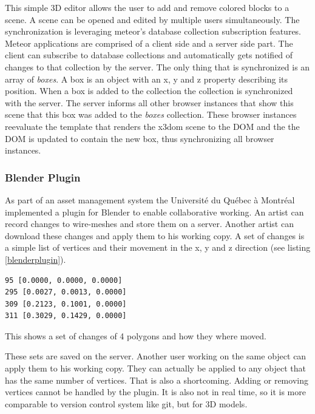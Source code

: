 This simple \gls{3D} editor allows the user to add and remove colored blocks to a
scene. A scene can be opened and edited by multiple users simultaneously. The synchronization is leveraging meteor's database collection
subscription features. Meteor applications are comprised of a client side and a
server side part. The client can subscribe to database collections and
automatically gets notified of changes to that collection by the server. The only
thing that is synchronized is an array of \emph{boxes}. A box is an
object with an x, y and z property describing its position. When a box is
added to the collection the collection is synchronized with the server. The
server informs all other browser instances that show this scene that this box was added to the \emph{boxes} collection.
These browser instances reevaluate the template that renders the x3dom scene to
the \gls{DOM} and the the \gls{DOM} is updated to contain the new box, thus synchronizing
all browser instances. \cite{3dmeteor}

\subsubsection{Blender Plugin}
\label{blender-plugin}

As part of an asset management system the Université du Québec à
Montréal implemented a plugin for Blender to enable collaborative working. An
artist can record changes to wire-meshes and store them on a server.
Another artist can download these changes and apply them to his working
copy. A set of changes is a simple list of vertices and their movement in the
x, y and z direction (see listing \ref{blenderplugin}). \cite{LCR07}

\begin{listing}
  \begin{verbatim}
95 [0.0000, 0.0000, 0.0000]
295 [0.0027, 0.0013, 0.0000]
309 [0.2123, 0.1001, 0.0000]
311 [0.3029, 0.1429, 0.0000]
  \end{verbatim}
  \caption{This shows a set of changes of 4 polygons and how they where moved.}
  \label{blenderplugin}
\end{listing}

These sets are saved on the server. Another user working on the same
object can apply them to his working copy. They can actually be applied
to any object that has the same number of vertices. That is also a
shortcoming. Adding or removing vertices cannot be handled by the
plugin. It is also not in real time, so it is more comparable to version
control system like \gls{git}, but for \gls{3D} models.

